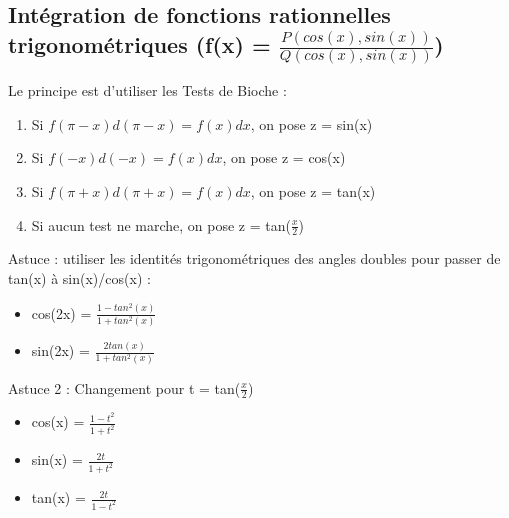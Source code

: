 \documentclass{article}
\begin{document}
\subsection{Intégration de fonctions rationnelles trigonométriques (f(x) = $\frac{P(cos(x), sin(x))}{Q(cos(x), sin(x))}$)}
Le principe est d'utiliser les Tests de Bioche :
\begin{enumerate}
    \item Si $f(\pi - x)d(\pi - x) = f(x)dx$, on pose z = sin(x)
    \item Si $f(-x)d(-x) = f(x)dx$, on pose z = cos(x)
    \item Si $f(\pi  + x)d(\pi + x) = f(x)dx$, on pose z = tan(x)
    \item Si aucun test ne marche, on pose z = tan($\frac{x}{2}$)
\end{enumerate}
Astuce : utiliser les identités trigonométriques des angles doubles pour passer de tan(x) à sin(x)/cos(x) :
\begin{itemize}
    \item cos(2x) = $\frac{1 - tan^2(x)}{1 + tan^2(x)}$
    \item sin(2x) = $\frac{2tan(x)}{1 + tan^2(x)}$
\end{itemize}
Astuce 2 : Changement pour t = tan($\frac{x}{2}$)
\begin{itemize}
    \item cos(x) = $\frac{1 - t^2}{1 + t^2}$
    \item sin(x) = $\frac{2t}{1 + t^2}$
    \item tan(x) = $\frac{2t}{1 - t^2}$
\end{itemize}
\end{document}
